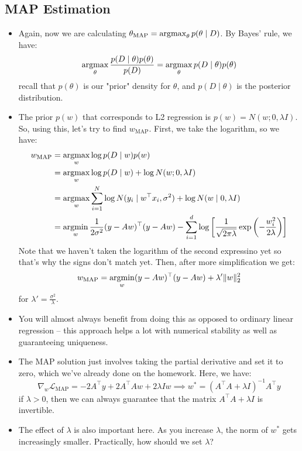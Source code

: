 \subsection{MAP Estimation}
\begin{itemize}
	\item Again, now we are calculating \( \theta_\text{MAP} = \operatorname*{argmax}_\theta
		p(\theta \mid D) \). By Bayes' rule, we have:
		\[
			\operatorname*{argmax}_\theta \frac{p(D \mid \theta) p(\theta)}{p(D)} = \operatorname*{argmax}_\theta
			p(D \mid \theta) p(\theta)
		\]
		recall that \( p(\theta) \) is our "prior" density for \( \theta \), and \(
		p(D \mid \theta) \) is the posterior distribution.
	\item The prior \( p(w) \) that corresponds to L2 regression is \( p(w) = N(w; 0,
		\lambda I)\). So, using this, let's try to find \( w_\text{MAP} \). First, we
		take the logarithm, so we have:
		\begin{align*}
			w_\text{MAP} &= \operatorname*{argmax}_w \log p(D \mid w) p(w)\\
						 &= \operatorname*{argmax}_w \log p(D \mid
			w) + \log N(w; 0, \lambda I)\\
			&= \operatorname*{argmax}_w \sum_{i = 1}^{N} \log N(y_i \mid w^{\top} x_i, \sigma^2) +
			\log N(w \mid 0, \lambda I) \\ 
			&= \operatorname*{argmin}_w \frac{1}{2\sigma^2}(y - Aw)^{\top}(y - Aw) - \sum_{i =
			1}^{d}\log\left[\frac{1}{\sqrt{2 \pi \lambda}} \operatorname*{exp} \left( -
			\frac{w_i^2}{2 \lambda} \right)\right]
		\end{align*}
		Note that we haven't taken the logarithm of the second expressino yet so
		that's why the signs don't match yet. Then, after more simplification we get:
		\[
			w_\text{MAP} = \operatorname*{argmin}_w (y - Aw)^{\top}(y - Aw) + \lambda' \|w\|_2^2
		\]
		for \( \lambda' = \frac{\sigma^2}{\lambda} \). 

	\item You will almost always benefit from doing this as opposed to ordinary
		linear regression -- this approach helps a lot with numerical stability as
		well as guaranteeing uniqueness.    
	\item The MAP solution just involves taking the partial derivative and set it to
		zero, which we've already done on the homework. Here, we have:
		\[
			\nabla_w \mathcal{L}_\text{MAP} = -2A^{\top} y + 2A^{\top} Aw + 2 \lambda
			I w \implies w^{*} = (A^{\top} A + \lambda I)^{-1} A^{\top} y 
		\]
		if \( \lambda > 0 \), then we can always guarantee that the matrix \(
		A^{\top} A + \lambda I \) is invertible.  
	\item The effect of \( \lambda \) is also important here. As you increase \(
		\lambda \), the norm of \( w^{*} \) gets increasingly smaller. Practically,
		how should we set \( \lambda \)? 

\end{itemize}

